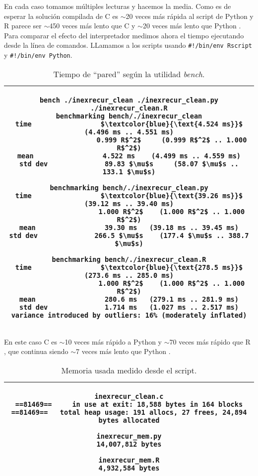 \documentclass{article}
\newcommand{\tempcaption}{}
\newenvironment{codesnip}[1]{
\begin{table}[h!]
\gdef\tempcaption{#1}
\centering
\begin{tabular}{|c|}
\hline}
{\\\hline
\end{tabular}
\caption{\tempcaption}
\end{table}}
\newcommand{\C}{C }
\newcommand{\R}{R }
\newcommand{\python}{Python }
\begin{document}
\vspace{-0.75cm}
En cada caso tomamos múltiples lecturas y hacemos la media. Como es de
esperar la solución compilada de \C{} es $\sim$20 veces más rápida  al
script de \python y \R parece ser $\sim$450 veces más lento que \C{} y
$\sim$20 veces más lento que \python.  Para  comparar  el  efecto  del
interpretador medimos ahora el tiempo ejecutando  desde  la  línea  de
comandos. LLamamos a los scripts usando \texttt{\#!/bin/env Rscript} y
\texttt{\#!/bin/env Python}.
\vspace{0.3cm}
\begin{codesnip}{Tiempo de ``pared'' según la utilidad \textit{bench}.}
\begin{lstlisting}
bench ./inexrecur_clean ./inexrecur_clean.py ./inexrecur_clean.R
benchmarking bench/./inexrecur_clean
time                 $\textcolor{blue}{\text{4.524 ms}}$           (4.496 ms .. 4.551 ms)
                     0.999 R$^2$     (0.999 R$^2$ .. 1.000 R$^2$)
mean                 4.522 ms    (4.499 ms .. 4.559 ms)
std dev              89.83 $\mu$s     (58.07 $\mu$s .. 133.1 $\mu$s)

benchmarking bench/./inexrecur_clean.py
time                 $\textcolor{blue}{\text{39.26 ms}}$           (39.12 ms .. 39.40 ms)
                     1.000 R$^2$    (1.000 R$^2$ .. 1.000 R$^2$)
mean                 39.30 ms   (39.18 ms .. 39.45 ms)
std dev              266.5 $\mu$s    (177.4 $\mu$s .. 388.7 $\mu$s)

benchmarking bench/./inexrecur_clean.R
time                 $\textcolor{blue}{\text{278.5 ms}}$           (273.6 ms .. 285.0 ms)
                     1.000 R$^2$    (1.000 R$^2$ .. 1.000 R$^2$)
mean                 280.6 ms   (279.1 ms .. 281.9 ms)
std dev              1.714 ms   (1.027 ms .. 2.517 ms)
variance introduced by outliers: 16% (moderately inflated)
\end{lstlisting}
\end{codesnip}

\vspace{-0.7cm}
En este caso \C{} es $\sim$10 veces más rápido a \python y $\sim$70
veces más rápido que \R, que continua siendo $\sim$7 veces más lento
que \python.

\clearpage
\begin{codesnip}{Memoria usada medido desde el script.}
\begin{lstlisting}
inexrecur_clean.c
==81469==     in use at exit: 18,588 bytes in 164 blocks
==81469==   total heap usage: 191 allocs, 27 frees, 24,894 bytes allocated

inexrecur_mem.py
14,007,812 bytes

inexrecur_mem.R
4,932,584 bytes
\end{lstlisting}
\end{codesnip}
\end{document}
